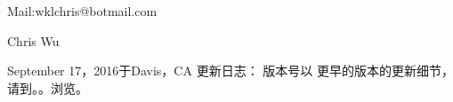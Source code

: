 \vfill

Mail:wklchris@botmail.com

Chris Wu

September 17，2016于Davis，CA
\clearpage%
更新日志：
版本号以
更早的版本的更新细节，请到。。浏览。



		
		
		
		

		\printindex%
		



